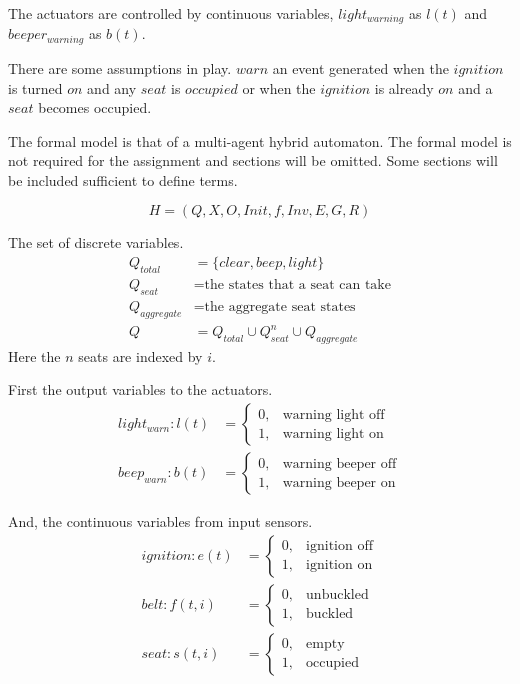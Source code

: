 \documentclass{article}
\begin{document}
The actuators are controlled by continuous variables,
$light_{warning}$ as $l(t)$ and
$beeper_{warning}$ as $b(t)$.

There are some assumptions in play.
$warn$ \is an event generated when the $ignition$ is
turned $on$ and any $seat$ is $occupied$ or when
the $ignition$ is already $on$ and a $seat$ becomes
occupied.

The formal model is that of a multi-agent hybrid automaton.
The formal model is not required for the assignment
and sections will be omitted.
Some sections will be included sufficient to define terms.

\begin{equation}
H = (Q, X, O, Init, f, Inv, E, G, R)
\end{equation}

The set of discrete variables.
\begin{align}
Q_{total} & = \{clear, beep, light \} \\
Q_{seat} & = \text{the states that a seat can take} \\
Q_{aggregate} & = \text{the aggregate seat states} \\
Q & = Q_{total} \cup Q_{seat}^n \cup Q_{aggregate}
\end{align}
Here the $n$ seats are indexed by $i$.

First the output variables to the actuators.
\begin{align}
light_{warn} : l(t) & =
   \begin{cases}
      0, & \text{warning light off} \\
      1, & \text{warning light on}
    \end{cases} \\
 beep_{warn} : b(t) & =
   \begin{cases}
      0, & \text{warning beeper off} \\
      1, & \text{warning beeper on}
    \end{cases}
\end{align}

And, the continuous variables from input sensors.
\begin{align}
 ignition : e(t) & =
   \begin{cases}
      0, & \text{ignition off} \\
      1, & \text{ignition on}
    \end{cases} \\
  belt : f(t,i) & =
   \begin{cases}
      0, & \text{unbuckled} \\
      1, & \text{buckled}
    \end{cases} \\
  seat : s(t,i) & =
   \begin{cases}
      0, & \text{empty} \\
      1, & \text{occupied}
    \end{cases}
\end{align}
\end{document}
